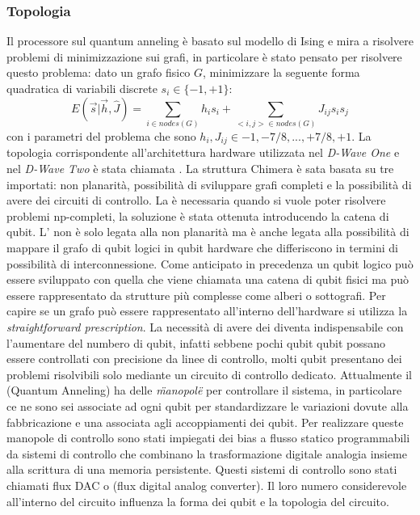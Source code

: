 \subsubsection{Topologia}
Il processore sul quantum anneling è basato sul modello di Ising e mira a risolvere problemi di minimizzazione sui grafi, in particolare è stato pensato per risolvere questo problema: dato un grafo fisico $G$, minimizzare la seguente forma quadratica di variabili discrete $s_i \in \{-1, +1\}$:
$$E(\vec{s}|\vec{h}, \hat{J}) = \sum_{i \in nodes(G)} h_i s_i + \sum_{<i,j> \in nodes(G)} J_{ij} s_i s_j$$
con i parametri del problema che sono $h_i, J_{ij} \in {-1, -7/8, ..., +7/8, +1}$. La topologia corrispondente all'architettura hardware utilizzata nel \textit{D-Wave One} e nel \textit{D-Wave Two} è stata chiamata . La struttura Chimera è sata basata su tre  importati: non planarità, possibilità di sviluppare grafi completi e la possibilità di avere dei circuiti di controllo. La  è necessaria quando si vuole poter risolvere problemi np-completi, la soluzione è stata ottenuta introducendo la catena di qubit. L' non è solo legata alla non planarità ma è anche legata alla possibilità di mappare il grafo di qubit logici in qubit hardware che differiscono in termini di possibilità di interconnessione. Come anticipato in precedenza un qubit logico può essere sviluppato con quella che viene chiamata una catena di qubit fisici ma può essere rappresentato da strutture più complesse come alberi o sottografi. Per capire se un grafo può essere rappresentato all'interno dell'hardware si utilizza la \textit{straightforward prescription}.
La necessità di avere dei  diventa indispensabile con l'aumentare del numbero di qubit, infatti sebbene pochi qubit qubit possano essere controllati con precisione da linee di controllo, molti qubit presentano dei problemi risolvibili solo mediante un circuito di controllo dedicato. Attualmente il  (Quantum Anneling) ha delle \textit{\"manopole\"} per controllare il sistema, in particolare ce ne sono sei associate ad ogni qubit per standardizzare le variazioni dovute alla fabbricazione e una associata agli accoppiamenti dei qubit. Per realizzare queste manopole di controllo sono stati impiegati dei bias a flusso statico programmabili da sistemi di controllo che combinano la trasformazione digitale analogia insieme alla scrittura di una memoria persistente. Questi sistemi di controllo sono stati chiamati flux DAC o  (flux digital analog converter). Il loro numero considerevole all'interno del circuito influenza la forma dei qubit e la topologia del circuito.
